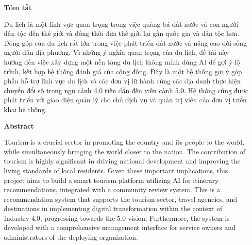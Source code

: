 \documentclass[12pt,a4paper]{article}
\theoremstyle{definition}
\begin{document}
\begin{center}
    \textbf{\Large Tóm tắt}
\end{center}
Du lịch là một lĩnh vực quan trọng trong việc quảng bá đất nước và con người dân tộc đến thế giới và đồng thời đưa thế giới lại gần quốc gia và dân tộc hơn. Đóng góp của du lịch rất lớn trong việc phát triển đất nước và nâng cao đời sống người dân địa phương. Vì những ý nghĩa quan trọng của du lịch, đề tài này hướng đến việc xây dựng một nền tảng du lịch thông minh dùng AI để gợi ý lộ trình, kết hợp hệ thống đánh giá của cộng đồng. Đây là một hệ thống gợi ý góp phần hỗ trợ lĩnh vực du lịch và các đơn vị lữ hành cùng các địa danh thực hiện chuyển đổi số trong ngữ cảnh 4.0 tiến dần đến viễn cảnh 5.0. Hệ thống cũng được phát triển với giao diện quản lý cho chủ dịch vụ và quản trị viên của đơn vị triển khai hệ thống.
\vspace{2cm}

\newpage

\begin{center}
    \textbf{\Large Abstract}
\end{center}
Tourism is a crucial sector in promoting the country and its people to the world, while simultaneously bringing the world closer to the nation. The contribution of tourism is highly significant in driving national development and improving the living standards of local residents. Given these important implications, this project aims to build a smart tourism platform utilizing AI for itinerary recommendations, integrated with a community review system. This is a recommendation system that supports the tourism sector, travel agencies, and destinations in implementing digital transformation within the context of Industry 4.0, progressing towards the 5.0 vision. Furthermore, the system is developed with a comprehensive management interface for service owners and administrators of the deploying organization.
\vspace{2cm}

\newpage

\begin{singlespace}
\renewcommand{\contentsname}{Mục lục}
\tableofcontents
\end{singlespace}
\newpage

\begin{singlespace}
\renewcommand{\listfigurename}{Danh sách hình ảnh}
\listoffigures
\end{singlespace}
\newpage

\begin{singlespace}
\renewcommand{\listtablename}{Danh sách bảng}
\listoftables
\end{singlespace}
\newpage
\end{document}
